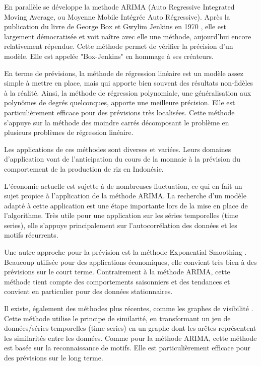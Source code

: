 \documentclass[12pt,a4paper]{article}
\begin{document}
En parallèle se développe la methode ARIMA (Auto Regressive Integrated Moving Average, ou Moyenne Mobile Intégrée Auto Régressive). Après la publication du livre de George Box et Gwylim Jenkins en 1970 \cite{boxjenkins}, elle est largement démocratisée et voit naître avec elle une méthode, aujourd'hui encore relativement répendue. Cette méthode permet de vérifier la précision d'un modèle. Elle est appelée "Box-Jenkins" en hommage à ses créateurs.

En terme de prévisions, la méthode de régression linéaire est un modèle assez simple à mettre en place, mais qui apporte bien souvent des résultats non-fidèles à la réalité. Ainsi, la méthode de régression polynomiale, une généralisation aux polynômes de degrés quelconques, apporte une meilleure précision. Elle est particulièrement efficace pour des prévisions très localisées. Cette méthode s'appuye sur la méthode des moindre carrés \cite{polyregrEva,polyregrElias} décomposant le problème en plusieurs problèmes de régression linéaire. 

Les applications de ces méthodes sont diverses et variées. Leurs domaines d'application vont de l'anticipation du cours de la monnaie \cite{zambiaES} à la prévision du comportement de la production de riz en Indonésie.

L'économie actuelle est sujette à de nombreuses fluctuation, ce qui en fait un sujet propice à l'application de la méthode ARIMA. La recherche d'un modèle adapté \cite{hughchristensen} à cette application \cite{economyARIMA} est une étape importante lors de la mise en place de l'algorithme. Très utile pour une application sur les séries temporelles (time series), elle s'appuye principalement sur l'autocorrélation des données et les motifs récurrents.

Une autre approche pour la prévision est la méthode Exponential Smoothing \cite{exporeview}. Beaucoup utilisée pour des applications économiques, elle convient très bien à des prévisions sur le court terme. Contrairement à la méthode ARIMA, cette méthode tient compte des comportements saisonniers et des tendances et convient en particulier pour des données stationnaires.

Il existe, également des méthodes plus récentes, comme les graphes de visibilité \cite{visigraphPhyA, visigraphTEPJB}. Cette méthode utilise le principe de similarité, en transformant un jeu de données/séries temporelles (time series) en un graphe \cite{visigraphPNAS} dont les arêtes représentent les similarités entre les données. Comme pour la méthode ARIMA, cette méthode est basée sur la reconnaissance de motifs. Elle est particulièrement efficace pour des prévisions sur le long terme. 
\end{document}
